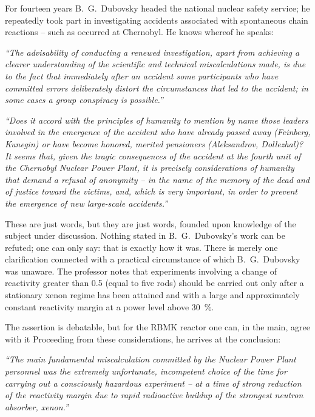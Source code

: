 \documentclass[openright]{bookest}
\begin{document}
For fourteen years B.~G.~Dubovsky headed the national nuclear safety service; he repeatedly took part in investigating accidents associated with spontaneous chain reactions -- such as occurred at Chernobyl. He knows whereof he speaks:

\begin{personal}
\textit{``The advisability of conducting a renewed investigation, apart from achieving a clearer understanding of the scientific and technical miscalculations made, is due to the fact that immediately after an accident some participants who have committed errors deliberately distort the circumstances that led to the accident; in some cases a group conspiracy is possible.''}

\textit{``Does it accord with the principles of humanity to mention by name those leaders involved in the emergence of the accident who have already passed away (Feinberg, Kunegin) or have become honored, merited pensioners (Aleksandrov, Dollezhal)? It seems that, given the tragic consequences of the accident at the fourth unit of the Chernobyl Nuclear Power Plant, it is precisely considerations of humanity that demand a refusal of anonymity -- in the name of the memory of the dead and of justice toward the victims, and, which is very important, in order to prevent the emergence of new large-scale accidents.''}
\end{personal}

These are just words, but they are just words, founded upon knowledge of the subject under discussion. Nothing stated in B.~G.~Dubovsky's work can be refuted; one can only say: that is exactly how it was. There is merely one clarification connected with a practical circumstance of which B.~G.~Dubovsky was unaware. The professor notes that experiments involving a change of reactivity greater than \qty{0.5}{\betaeff} (equal to five rods) should be carried out only after a stationary xenon regime has been attained and with a large and approximately constant reactivity margin at a power level above \qty{30}{\percent}.

The assertion is debatable, but for the RBMK reactor one can, in the main, agree with it Proceeding from these considerations, he arrives at the conclusion:

\begin{personal}
\textit{``The main fundamental miscalculation committed by the Nuclear Power Plant personnel was the extremely unfortunate, incompetent choice of the time for carrying out a consciously hazardous experiment -- at a time of strong reduction of the reactivity margin due to rapid radioactive buildup of the strongest neutron absorber, xenon.''}
\end{personal}
\end{document}
